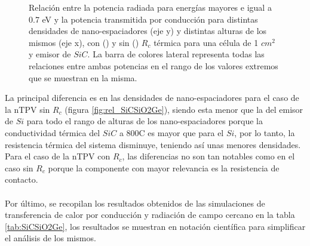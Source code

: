 \begin{figure}[H]
\begin{subfigure}[b]{0.49\textwidth}
		\caption{ }
		\label{fig:rel_SiCSiO2Ge_Rc}
	\end{subfigure}
	\caption[Relación entre la potencia radiada para energías mayores e igual a 0.7 eV y la potencia transmitida por conducción para distintas densidades de nano-espaciadores (eje y) y distintas alturas de los mismos (eje x), con () y sin () $R_c$ térmica para una célula de 1 $cm^2$ y emisor de $SiC$. La barra de colores lateral representa todas las relaciones entre ambas potencias en el rango de los valores extremos que se muestran en la misma.]{\small
	Relación entre la potencia radiada para energías mayores e igual a 0.7 eV y la potencia transmitida por conducción para distintas densidades de nano-espaciadores (eje y) y distintas alturas de los mismos (eje x), con () y sin () $R_c$ térmica para una célula de 1 $cm^2$ y emisor de $SiC$. La barra de colores lateral representa todas las relaciones entre ambas potencias en el rango de los valores extremos que se muestran en la misma.
	}
	\label{fig:relation_SiCSiO2Ge}
\end{figure}
La principal diferencia es en las densidades de nano-espaciadores para el caso de la nTPV sin $R_c$ (figura \ref{fig:rel_SiCSiO2Ge}), siendo esta menor que la del emisor de $Si$ para todo el rango de alturas de los nano-espaciadores porque la conductividad térmica del $SiC$ a 800\textdegree C es mayor que para el $Si$, por lo tanto, la resistencia térmica del sistema disminuye, teniendo así unas menores densidades. Para el caso de la nTPV con $R_c$, las diferencias no son tan notables como en el caso sin $R_c$ porque la componente con mayor relevancia es la resistencia de contacto.\\\\
Por último, se recopilan los resultados obtenidos de las simulaciones de transferencia de calor por conducción y radiación de campo cercano en la tabla \ref{tab:SiCSiO2Ge}, los resultados se muestran en notación científica para simplificar el análisis de los mismos.
